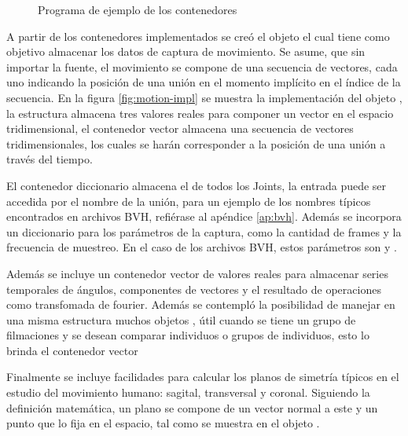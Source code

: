 \begin{figure}
    
    \caption{Programa de ejemplo de los contenedores}
    \label{fig:containers}
\end{figure}

A partir de los contenedores implementados se creó el objeto  el cual tiene como objetivo almacenar los datos de captura de movimiento. Se asume, que sin importar la fuente, el movimiento se compone de una secuencia de vectores, cada uno indicando la posición de una unión en el momento implícito en el índice de la secuencia. En la figura \ref{fig:motion-impl} se muestra la implementación del objeto , la estructura  almacena tres valores reales para componer un vector en el espacio tridimensional, el contenedor vector  almacena una secuencia de vectores tridimensionales, los cuales se harán corresponder a la posición de una unión a través del tiempo. 

El contenedor diccionario  almacena el  de todos los Joints, la entrada puede ser accedida por el nombre de la unión, para un ejemplo de los nombres típicos encontrados en archivos BVH, refiérase al apéndice \ref{ap:bvh}. Además se incorpora un diccionario para los parámetros de la captura, como la cantidad de frames y la frecuencia de muestreo. En el caso de los archivos BVH, estos parámetros son  y . 

Además se incluye un contenedor vector de valores reales para almacenar series temporales de ángulos, componentes de vectores y el resultado de operaciones como transfomada de fourier. Además se contempló la posibilidad de manejar en una misma estructura muchos objetos , útil cuando se tiene un grupo de filmaciones y se desean comparar individuos o grupos de individuos, esto lo brinda el contenedor vector  

Finalmente se incluye facilidades para calcular los planos de simetría típicos en el estudio del movimiento humano: sagital, transversal y coronal. Siguiendo la definición matemática, un plano se compone de un vector normal a este y un punto que lo fija en el espacio, tal como se muestra en el objeto .

